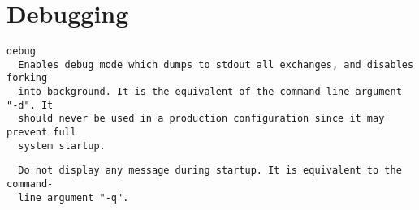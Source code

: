 
\section{Debugging}
\begin{verbatim}
debug
  Enables debug mode which dumps to stdout all exchanges, and disables forking
  into background. It is the equivalent of the command-line argument "-d". It
  should never be used in a production configuration since it may prevent full
  system startup.
\end{verbatim}

\begin{verbatim}
  Do not display any message during startup. It is equivalent to the command-
  line argument "-q".
\end{verbatim}

